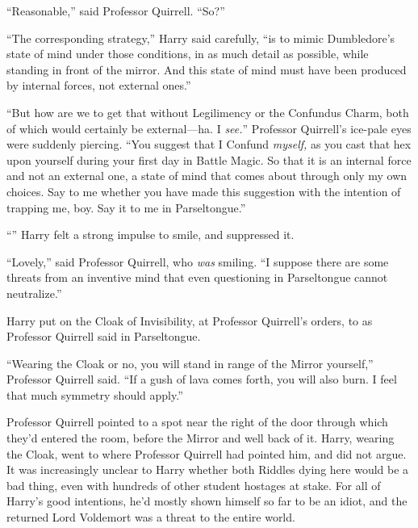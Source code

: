 “Reasonable,” said Professor Quirrell. “So?”

“The corresponding strategy,” Harry said carefully, “is to mimic Dumbledore’s state of mind under those conditions, in as much detail as possible, while standing in front of the mirror. And this state of mind must have been produced by internal forces, not external ones.”

“But how are we to get that without Legilimency or the Confundus Charm, both of which would certainly be external—ha. I \emph{see.}” Professor Quirrell’s ice-pale eyes were suddenly piercing. “You suggest that I Confund \emph{myself,} as you cast that hex upon yourself during your first day in Battle Magic. So that it is an internal force and not an external one, a state of mind that comes about through only my own choices. Say to me whether you have made this suggestion with the intention of trapping me, boy. Say it to me in Parseltongue.”

“” Harry felt a strong impulse to smile, and suppressed it.

“Lovely,” said Professor Quirrell, who \emph{was} smiling. “I suppose there are some threats from an inventive mind that even questioning in Parseltongue cannot neutralize.”

\later

Harry put on the Cloak of Invisibility, at Professor Quirrell’s orders, to  as Professor Quirrell said in Parseltongue.

“Wearing the Cloak or no, you will stand in range of the Mirror yourself,” Professor Quirrell said. “If a gush of lava comes forth, you will also burn. I feel that much symmetry should apply.”

Professor Quirrell pointed to a spot near the right of the door through which they’d entered the room, before the Mirror and well back of it. Harry, wearing the Cloak, went to where Professor Quirrell had pointed him, and did not argue. It was increasingly unclear to Harry whether both Riddles dying here would be a bad thing, even with hundreds of other student hostages at stake. For all of Harry’s good intentions, he’d mostly shown himself so far to be an idiot, and the returned Lord Voldemort was a threat to the entire world.

